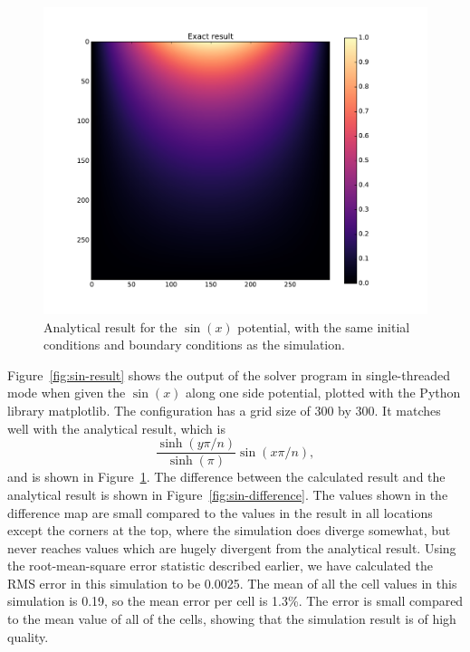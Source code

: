 \begin{figure}[h!]
	\centering
	\includegraphics[width=1.1\linewidth]{sin300_exact.pdf}
	\caption{Analytical result for the $\sin(x)$ potential, with the same initial conditions and boundary conditions as the simulation.}
	\label{fig:sin-analytic}
	\end{figure}



Figure~\ref{fig:sin-result} shows the output of the solver program in single-threaded mode when given the $\sin(x)$ along one side
potential, plotted with the Python library matplotlib. The configuration has a grid size of 300 by 300. It matches well with the analytical result, which
is
$$\frac{\sinh(y \pi / n)}{\sinh(\pi)} \sin(x \pi / n),$$
and is shown in Figure~\ref{fig:sin-analytic}. The difference between the calculated result and the
analytical result is shown in Figure~\ref{fig:sin-difference}. The values shown in the difference map are small compared
to the values in the result in all locations except the corners at the top, where the simulation does diverge somewhat, 
but never reaches values which are hugely divergent from the analytical result. Using the root-mean-square error statistic
described earlier, we have calculated the RMS error in this simulation to be 0.0025. The mean of all the cell values in this
simulation is 0.19, so the mean error per cell is 1.3\%. The error is small compared to the mean value of all of the cells,
showing that the simulation result is of high quality.


